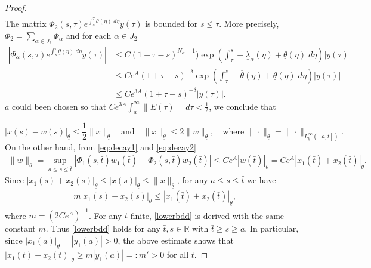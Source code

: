 \documentclass[a4paper,11pt]{article}
\def\blue{\color{blue}}
\newcommand{\udl}{\underline{\lambda}}
\newcommand{\tl}{{\underline{\theta}}}
\newcommand{\tu}{{\overline{\theta}}}
\newcommand{\bt}{{\bar{t}}}
\theoremstyle{remark}
\begin{document}
\begin{proof}
\begin{align}
\end{align}
The matrix $\Phi_2(s,\tau)e^{\int_s^\tau \theta(\eta)\;d\eta}y(\tau)$ is bounded for $s\le \tau$. More precisely, $\Phi_2 = \displaystyle \sum_{\alpha \in J_2} \Phi_\alpha$ and for each $\alpha \in J_2$
\begin{align}
 \left|\Phi_\alpha(s,\tau)e^{\int_s^\tau \tl(\eta)\;d\eta}y(\tau)\right| &\le C(1 + \tau-s)^{N_\alpha-1})\exp\left(\int_\tau^s -\udl_\alpha(\eta)+\tl(\eta) \; d\eta\right)|y(\tau)| \nonumber\\
 &\le Ce^A(1 + \tau-s)^{-\delta}\exp\left(\int_\tau^s -\tu(\eta)+\tl(\eta) \; d\eta\right)|y(\tau)| \nonumber\\
 &\le Ce^{3A}(1 + \tau-s)^{-\delta}|y(\tau)|. \label{eq:decay2}
\end{align}
$a$ could been chosen so that $Ce^{3A} \int_a^\infty \|E(\tau)\| \;d\tau < \frac{1}{2}$, we conclude that

$$|x(s)-w(s)|_\tl \le \frac{1}{2} \|x\|_\tl \quad \text{and} \quad \|x\|_\tl \le 2\|w\|_\tl, \quad \text{where $\|\cdot\|_\tl = \|\cdot\|_{L^\infty_\tl ([a,\bt])}$}.$$
% 
On the other hand, from \eqref{eq:decay1} and \eqref{eq:decay2}
\begin{align*}
 \|w\|_\tl = \sup_{a\le s\le \bt} \left| \Phi_1(s,\bt)w_1(\bt) + \Phi_2(s,\bt)w_2(\bt)\right|\le  Ce^A |w(\bt)|_\tl =Ce^A|x_1(\bt) + x_2(\bt)|_\tl.%
\end{align*}
Since $|x_1(s)+x_2(s)|_\tl \le |x(s)|_\tl \le \|x\|_\tl$, for any $a \le s\le \bt$ we have
\begin{align} \label{lowerbdd}
 m |x_1(s)+x_2(s)|_\tl \le |x_1(\bt) + x_2(\bt)|_\tl ,
\end{align}
where $m=(2Ce^A)^{-1}$. 
For any $\bt$ finite, \eqref{lowerbdd} is derived with the same constant $m$. Thus \eqref{lowerbdd} holds for any $\bt,s \in \mathbb{R}$ with $\bt\ge s\ge a$. In particular, since $|x_1(a)|_\tl=|y_1(a)| >0$, the above estimate shows that $|x_1(t)+x_2(t)|_\tl\ge m|y_1(a)|=:m'>0 $ for all $t$.


\end{proof}
\end{document}
